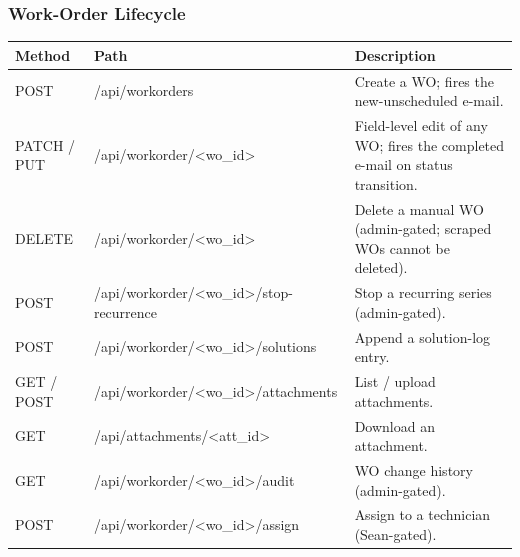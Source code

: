 \documentclass[11pt,a4paper]{article}
\newcommand{\sbrk}{\hspace{0pt}}
\begin{document}
\subsubsection{Work-Order Lifecycle}
\begin{longtable}{@{}p{}>{\ttfamily\small}p{}p{}@{}}
\toprule
\textbf{Method} & \textbf{Path} & \textbf{Description} \\
\midrule
\endhead
POST & /\sbrk api/\sbrk workorders & Create a WO; fires the new-unscheduled e-mail. \\
PATCH / PUT & /\sbrk api/\sbrk workorder/\sbrk <wo\_id> & Field-level edit of any WO; fires the completed e-mail on status transition. \\
DELETE & /\sbrk api/\sbrk workorder/\sbrk <wo\_id> & Delete a manual WO (admin-gated; scraped WOs cannot be deleted). \\
POST & /\sbrk api/\sbrk workorder/\sbrk <wo\_id>/\sbrk stop-recurrence & Stop a recurring series (admin-gated). \\
POST & /\sbrk api/\sbrk workorder/\sbrk <wo\_id>/\sbrk solutions & Append a solution-log entry. \\
GET / POST & /\sbrk api/\sbrk workorder/\sbrk <wo\_id>/\sbrk attachments & List / upload attachments. \\
GET & /\sbrk api/\sbrk attachments/\sbrk <att\_id> & Download an attachment. \\
GET & /\sbrk api/\sbrk workorder/\sbrk <wo\_id>/\sbrk audit & WO change history (admin-gated). \\
POST & /\sbrk api/\sbrk workorder/\sbrk <wo\_id>/\sbrk assign & Assign to a technician (Sean-gated). \\
\bottomrule
\end{longtable}
\end{document}
